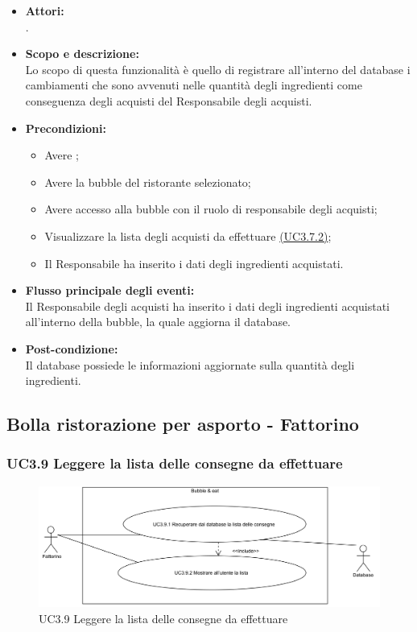 \begin{itemize}
	\item \textbf{Attori:}
	\\.
	\item \textbf{Scopo e descrizione:} 
	\\Lo scopo di questa funzionalità è quello di registrare all’interno del database i cambiamenti che sono avvenuti nelle quantità degli ingredienti come conseguenza degli acquisti del Responsabile degli acquisti.
	\item \textbf{Precondizioni:}
	\begin{itemize}
		\item Avere ;
		\item Avere la bubble del ristorante selezionato;
		\item Avere accesso alla bubble con il ruolo di responsabile degli acquisti;
		\item Visualizzare la lista degli acquisti da effettuare \hyperref[UC3.7.2]{(UC3.7.2)};
		\item Il Responsabile ha inserito i dati degli ingredienti acquistati.
	\end{itemize}
	\item \textbf{Flusso principale degli eventi:}
	\\Il Responsabile degli acquisti ha inserito i dati degli ingredienti acquistati all’interno della bubble, la quale aggiorna il database.
	\item \textbf{Post-condizione:}
	\\Il database possiede le informazioni aggiornate sulla quantità degli ingredienti.
\end{itemize}

\subsection{Bolla ristorazione per asporto - Fattorino}

\subsubsection{UC3.9 Leggere la lista delle consegne da effettuare} \label{UC3.9}

\begin{figure}[H]
	\centering
	\includegraphics[width=15cm]{../../documenti/AnalisiDeiRequisiti/Diagrammi_img/uc3_9.png}
	\caption{UC3.9 Leggere la lista delle consegne da effettuare}
\end{figure}

